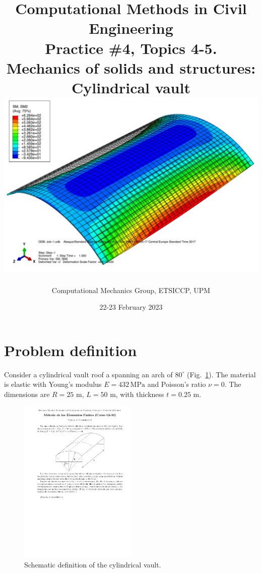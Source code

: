 \documentclass[english,a4paper,12pt]{article}
\title{\vspace*{-4ex}
	\bf\normalsize
	Computational Methods in Civil Engineering\\
	\Large
	Practice \#4, Topics 4-5.\\
	Mechanics of solids and structures: Cylindrical vault\\[3ex]
	\includegraphics[scale=0.50]{figs/boveda2017-5}
	}
\author{%
        {\small\sc 
	Computational Mechanics Group, ETSICCP, UPM}}
\date{22-23 February 2023}
\begin{document}
\pagestyle{fancy}
\lhead[\fancyplain{}{\thepage}]{\fancyplain{}{\rightmark}}
\rhead[\fancyplain{}{\leftmark}]{\fancyplain{}{\thepage}}
\cfoot[\fancyplain{\thepage}{}]{\fancyplain{\thepage}{}}

\renewcommand{\sectionmark}[1]{\markright{\sf Sect.\ \thesection. #1}{}}


\maketitle

\tableofcontents


\section{Problem definition}
\label{sec:problema}
Consider a cylindrical vault roof a spanning an arch of $80^{\circ}$ 
(Fig.~\ref{fig:esquema}).
The material is elastic with Young's modulus $E=432\,\text{MPa}$ and Poisson's ratio $\nu=0$.
The dimensions are $R=25$ m, $L=50$ m, with thickness $t=0.25$ m.\begin{figure}[!ht]
\centering
\includegraphics[width=0.5\textwidth]{figs/boveda_scordelis-lo}
\caption{Schematic definition of the cylindrical vault.}
\label{fig:esquema}
\end{figure}
\end{document}
